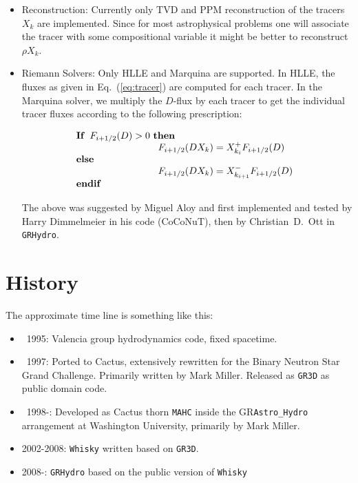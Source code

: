 \documentclass{article}
\begin{document}
\begin{itemize}
  \item Reconstruction: Currently only TVD and PPM reconstruction of the
    tracers $X_k$ are implemented. Since for most astrophysical problems one
    will associate the tracer with some compositional variable it might
    be better to reconstruct $\rho X_k$.

  \item Riemann Solvers: Only HLLE and Marquina are supported. In HLLE,
    the fluxes as given in Eq.~(\ref{eq:tracer}) are computed for each tracer.
    In the Marquina solver, we multiply the $D$-flux by each tracer to get
    the individual tracer fluxes according to the following prescription:

    \begin{equation}
      \label{eq:marquinatracer}
      \begin{array}[l]{l}
	{\bf If}\ \, F_{i+1/2} (D) > 0 \,\, {\bf then} \\
	  \qquad \qquad \begin{array}[c]{l}
	    \qquad \qquad F_{i+1/2} (D X_k) = X_{k_i}^+ F_{i+1/2} (D)
	  \end{array} \\
		 {\bf else} \\
		 \qquad \qquad \begin{array}[c]{r c l}
		   \qquad \qquad F_{i+1/2} (D X_k) = X_{k_{i+1}}^- F_{i+1/2} (D)
		 \end{array} \\
			{\bf end if} \\
      \end{array} \\
    \end{equation}

    The above was suggested by Miguel Aloy and first implemented and
    tested by Harry Dimmelmeier in his code (CoCoNuT), then by Christian~D.~Ott
    in {\tt GRHydro}.

\end{itemize}


\section{History}

The approximate time line is something like this:
\begin{itemize}
\item ~1995: Valencia group hydrodynamics code, fixed spacetime.
\item ~1997: Ported to Cactus, extensively rewritten for the Binary
  Neutron Star Grand Challenge. Primarily written by Mark Miller.
  Released as {\tt GR3D} as public domain code.
\item ~1998-: Developed as Cactus thorn {\tt MAHC} inside the
  GR{\tt Astro\_Hydro} arrangement at Washington University, primarily by
  Mark Miller.
\item 2002-2008: {\tt Whisky} written based on {\tt GR3D}.
\item 2008-: {\tt GRHydro} based on the public version of {\tt Whisky}
\end{itemize}
\end{document}
